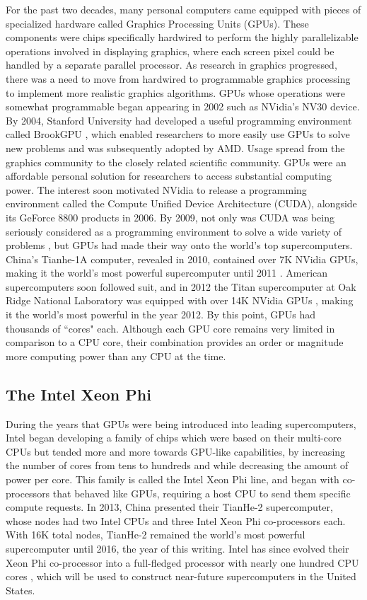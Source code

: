 For the past two decades, many personal computers came
equipped with pieces of specialized hardware called
Graphics Processing Units (GPUs).
These components were chips specifically hardwired to
perform the highly parallelizable operations involved
in displaying graphics, where each screen pixel could be handled
by a separate parallel processor.
As research in graphics progressed, there was a need to
move from hardwired to programmable graphics processing
to implement more realistic graphics algorithms.
GPUs whose operations were somewhat programmable began appearing
in 2002 such as NVidia's NV30 device.
By 2004, Stanford University had developed a useful programming
environment called BrookGPU \cite{buck2004brook}, which
enabled researchers to more easily use GPUs to solve new problems
and was subsequently adopted by AMD.
Usage spread from the graphics community to the closely
related scientific community.
GPUs were an affordable personal solution for researchers
to access substantial computing power.
The interest soon motivated NVidia to release a programming
environment called the Compute Unified Device Architecture (CUDA),
alongside its GeForce 8800 products in 2006.
By 2009, not only was CUDA was being seriously considered as a programming
environment to solve a wide variety of problems \cite{hwu2009compute},
but GPUs had made their way onto the world's top supercomputers.
China's Tianhe-1A computer, revealed in 2010,
contained over 7K NVidia GPUs, making it the world's
most powerful supercomputer until 2011 \cite{yang2011tianhe}.
American supercomputers soon followed suit, and in 2012
the Titan supercomputer at Oak Ridge National Laboratory
was equipped with over 14K NVidia GPUs \cite{bland2012titan},
making it the world's most powerful in the year 2012.
By this point, GPUs had thousands of ``cores" each.
Although each GPU core remains very limited in comparison to a
CPU core, their combination provides an order or magnitude
more computing power than any CPU at the time.

\subsection{The Intel Xeon Phi}

During the years that GPUs were being introduced into leading supercomputers,
Intel began developing a family of chips which were based on
their multi-core CPUs but tended more and more towards GPU-like capabilities,
by increasing the number of cores from tens to hundreds and while decreasing
the amount of power per core.
This family is called the Intel Xeon Phi line, and began with co-processors
that behaved like GPUs, requiring a host CPU to send them specific compute
requests.
In 2013, China presented their TianHe-2 supercomputer, whose nodes had two Intel
CPUs and three Intel Xeon Phi co-processors each.
With 16K total nodes, TianHe-2 remained the world's most powerful supercomputer
until 2016, the year of this writing.
Intel has since evolved their Xeon Phi co-processor into a full-fledged
processor with nearly one hundred CPU cores \cite{jeffers2013intel},
which will be used to construct near-future supercomputers in the United States.

